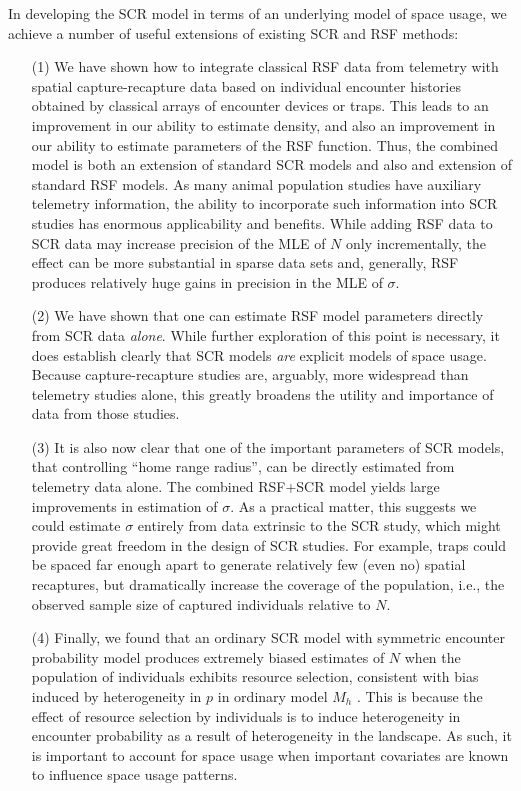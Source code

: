 \documentclass[12pt]{article}
\begin{document}
In developing the SCR model in terms of an underlying model of space
usage, we achieve a number of useful extensions of existing
SCR and RSF methods:
\begin{itemize}
\item[(1)] We have shown how to integrate classical RSF data from
telemetry with spatial capture-recapture data based on individual
encounter histories obtained by classical arrays of encounter devices
or traps. This leads to an improvement in our ability to estimate
density, and also an improvement in our ability to estimate parameters
of the RSF function.  Thus, the combined model is both an extension of
standard SCR models and also and extension of standard RSF models. As
many animal population studies have auxiliary telemetry information,
the ability to incorporate such information into SCR studies has
enormous applicability and
benefits.
While adding RSF data to SCR data may increase precision of the MLE of $N$
only incrementally, the effect can be more substantial in sparse data sets
and, generally, RSF produces
relatively huge gains in precision in the MLE of $\sigma$.
\item[(2)] We have shown that one can estimate RSF model parameters
directly from SCR data {\it alone}.
While further exploration of this point
is necessary,
it does establish clearly that SCR
models {\it are} explicit models of space usage. Because
capture-recapture studies are, arguably, more widespread than
telemetry studies alone, this greatly broadens the utility and
importance of data from those studies.
\item[(3)] It is also now clear
that one of the important parameters of SCR models, that controlling
``home range radius'', can be directly estimated from telemetry data
alone.
The combined RSF+SCR model yields large improvements in estimation
of $\sigma$. As a practical matter, this suggests we could estimate
$\sigma$ entirely from data extrinsic to the SCR study, which might
provide great freedom in the design of SCR studies. For example, traps
could be spaced far enough apart to generate relatively few (even no) spatial recaptures,
but dramatically increase the coverage of the population, i.e., the
observed sample size of captured individuals relative to $N$.
\item[(4)] Finally, we found that an
ordinary SCR model with symmetric encounter probability model produces
extremely biased estimates of $N$ when the population of individuals
exhibits resource selection, consistent with bias induced by
heterogeneity in $p$ in ordinary model $M_{h}$
\citep{dorazio_royle:2003}. This is because the effect of resource
selection by individuals is to induce heterogeneity in encounter
probability as a result of heterogeneity in the landscape.
  As such, it is important to account
for space usage when important covariates are known to influence
space usage patterns.
\end{itemize}
\end{document}
